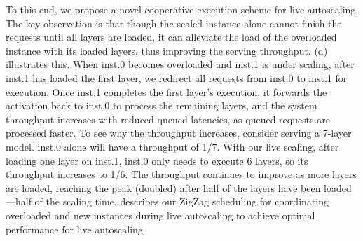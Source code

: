 To this end,
we propose a novel cooperative execution scheme for live autoscaling.
The key observation is that though the scaled instance alone
cannot finish the requests until all layers are loaded,
it can alleviate the load of the overloaded instance with its loaded layers,
thus improving the serving throughput.
{} (d) illustrates this.
When inst.0 becomes overloaded and inst.1 is under scaling,
after inst.1 has loaded the first layer,
we redirect all requests from inst.0 to inst.1 for execution.
Once inst.1 completes the first layer's execution,
it forwards the activation back to inst.0 to process the remaining layers,
and the system throughput increases with reduced queued latencies,
as queued requests are processed faster. 
To see why the throughput increases, 
consider serving a 7-layer model.
inst.0 alone will have a throughput of 1/7.
With our live scaling,
after loading one layer on inst.1,
inst.0 only needs to execute 6 layers,
so its throughput increases to 1/6.
The throughput continues to improve as more layers are loaded,
reaching the peak (doubled) after half of the layers have been loaded---half of the scaling time.
\textsection{\ref{sec:design-pp}} describes our ZigZag scheduling for coordinating overloaded
and new instances during live autoscaling to achieve optimal performance for live autoscaling.